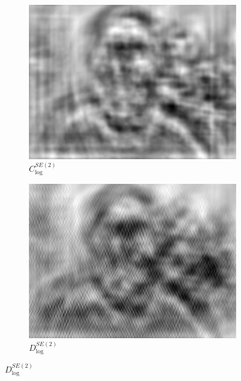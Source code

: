 \documentclass{article}
\begin{document}
\begin{figure}[h!]
\begin{subfigure}[b]{0.1\textwidth}
        \label{fig:mean and std of net44}
    \end{subfigure}
    \hspace{-1\baselineskip}
    \quad
    \begin{subfigure}[b]{0.1\textwidth}   
        \centering 
        \includegraphics[width=\textwidth]{plots/C_log_SE2_conv.jpg}
        \caption{$C_{\text{log}}^{SE(2)}$}%
        
        \label{fig:mean and std of net44}
    \end{subfigure}
    \hspace{-1\baselineskip}
    \quad
    \begin{subfigure}[b]{0.1\textwidth}   
        \centering 
        \includegraphics[width=\textwidth]{plots/D_log_SE2_conv.jpg}
        \caption{$D_{\text{log}}^{SE(2)}$}%
        

\end{subfigure}
\end{figure}
\end{document}
